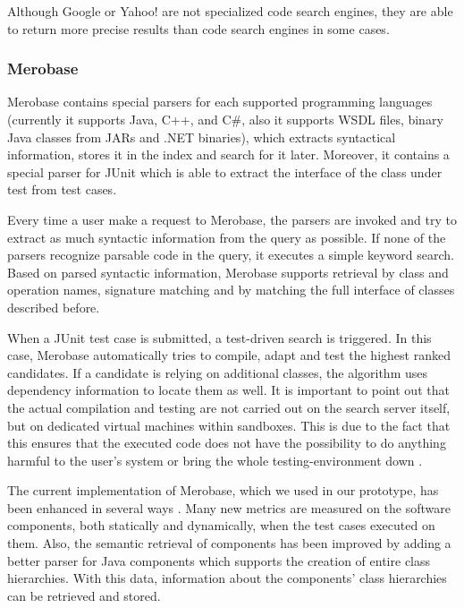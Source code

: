 Although Google or Yahoo! are not specialized code search engines, they are able to return more precise results than code search engines in some cases\cite{Hummel2007}.

\subsubsection{Merobase}
\label{subsec:merobase}

Merobase contains special parsers for each supported programming languages (currently it supports Java, C++, and C\#, also it supports WSDL files, binary Java classes from JARs and .NET binaries), which extracts syntactical information, stores it in the index and search for it later. Moreover, it contains a special parser for JUnit which is able to extract the interface of the class under test from test cases.

Every time a user make a request to Merobase, the parsers are invoked and try to extract as much syntactic information from the query as possible. If none of the parsers recognize parsable code in the query, it executes a simple keyword search. Based on parsed syntactic information, Merobase supports retrieval by class and operation names, signature matching and by matching the full interface of classes described before.

When a JUnit test case is submitted, a test-driven search is triggered. In this case, Merobase automatically tries to compile, adapt and test the highest ranked candidates. If a candidate is relying on additional classes, the algorithm uses dependency information to locate them as well. It is important to point out that the actual compilation and testing are not carried out on the search server itself, but on dedicated virtual machines within sandboxes. This is due to the fact that this ensures that the executed code does not have the possibility to do anything harmful to the user's system or bring the whole testing-environment down \cite{Hummel2013}.

The current implementation of Merobase, which we used in our prototype, has been enhanced in several ways \cite{Kessel2016}. Many new metrics are measured on the software components, both statically and dynamically, when the test cases executed on them. Also, the semantic retrieval of components has been improved by adding a better parser for Java components which supports the creation of entire class hierarchies. With this data, information about the components' class hierarchies can be retrieved and stored.

